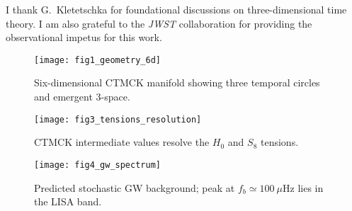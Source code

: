 \documentclass[reprint,amsmath,amssymb,aps,prd,nofootinbib,longbibliography]{revtex4-2}
\begin{document}
\begin{acknowledgments}
I thank G.~Kletetschka for foundational discussions on three-dimensional time theory. I am also grateful to the \textit{JWST} collaboration for providing the observational impetus for this work.
\end{acknowledgments}

\begin{figure}[t]
  \centering
  \texttt{[image: fig1\_geometry\_6d]}
  \caption{Six-dimensional CTMCK manifold showing three temporal circles and emergent 3-space.}
  \label{fig:geometry}
\end{figure}

\begin{figure}[t]
  \centering
  \texttt{[image: fig3\_tensions\_resolution]}
  \caption{CTMCK intermediate values resolve the $H_0$ and $S_8$ tensions.}
  \label{fig:tensions}
\end{figure}

\begin{figure}[t]
  \centering
  \texttt{[image: fig4\_gw\_spectrum]}
  \caption{Predicted stochastic GW background; peak at $f_b\simeq100\ \mu$Hz lies in the \textsc{LISA} band.}
  \label{fig:gw}
\end{figure}



\end{document}
